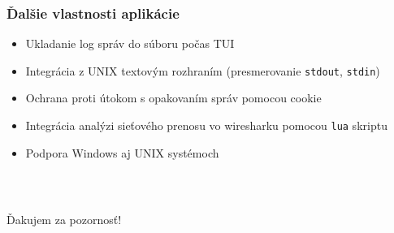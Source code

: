 \documentclass[%
  14pt,       				%
	t,                  %
	aspectratio=1610,   %
	unicode,						%
]{beamer}				    	%
\begin{document}
\begin{frame}[c]
	\frametitle{Ďalšie vlastnosti aplikácie}
	\large{\begin{itemize}
			\item Ukladanie log správ do súboru počas TUI
			\item Integrácia z UNIX textovým rozhraním (presmerovanie \texttt{stdout}, \texttt{stdin})
			\item Ochrana proti útokom s opakovaním správ pomocou cookie
			\item Integrácia analýzi sieťového prenosu vo wiresharku pomocou \texttt{lua} skriptu
			\item Podpora Windows aj UNIX systémoch
		\end{itemize}}
\end{frame}

\begin{frame}[c]
	\frametitle{\mbox{ }}
	\begin{center}
		{\Huge Ďakujem za pozornosť!}
	\end{center}
\end{frame}

\end{document}
